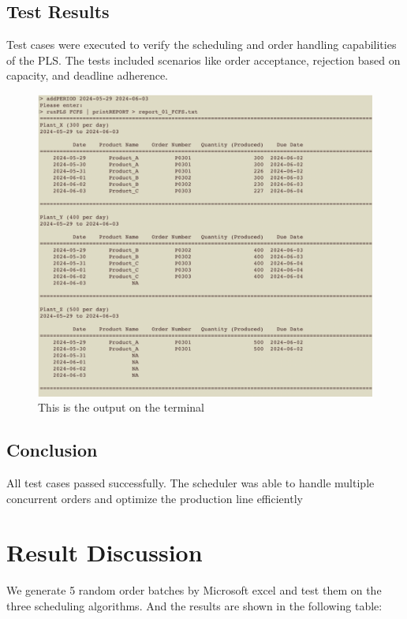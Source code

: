 \documentclass[conference]{IEEEtran}
\begin{document}
\subsection{Test Results}
Test cases were executed to verify the scheduling and order handling capabilities of the PLS. The tests included scenarios like order acceptance, rejection based on capacity, and deadline adherence.

\begin{figure}[htbp]
\centering
\includegraphics[width=0.9\columnwidth]{Figures/Output.png}
\caption{This is the output on the terminal}
\label{fig:Output}
\end{figure}

\subsection{Conclusion}
All test cases passed successfully. The scheduler was able to handle multiple concurrent orders and optimize the production line efficiently


\section{\textbf{Result Discussion}}
We generate 5 random order batches by Microsoft excel and test them on the three scheduling algorithms. And the results are shown in the following table:

\begin{table}[htbp]
\centering
\caption{Performance Results}
\label{tab:mm}
\end{table}
\end{document}
